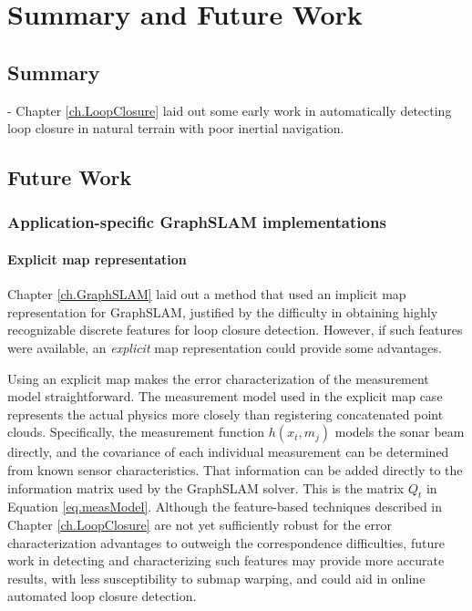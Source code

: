 
\chapter{Summary and Future Work}
\label{ch.FutureWork}

\section{Summary}
- Chapter \ref{ch.LoopClosure} laid out some early work in automatically detecting loop closure in natural terrain with poor inertial navigation. 

\section{Future Work}

\subsection{Application-specific GraphSLAM implementations}

\subsubsection{Explicit map representation}

Chapter \ref{ch.GraphSLAM} laid out a method that used an implicit map representation for GraphSLAM, justified by the difficulty in obtaining highly recognizable discrete features for loop closure detection. However, if such features were available, an \emph{explicit} map representation could provide some advantages. 

Using an explicit map makes the error characterization of the measurement model straightforward. The measurement model used in the explicit map case represents the actual physics more closely than registering concatenated point clouds. Specifically, the measurement function $h\left(x_t,m_j\right)$ models the sonar beam directly, and the covariance of each individual measurement can be determined from known sensor characteristics. That information can be added directly to the information matrix used by the GraphSLAM solver. This is the matrix $Q_t$ in Equation \ref{eq.measModel}. Although the feature-based techniques described in Chapter \ref{ch.LoopClosure} are not yet sufficiently robust for the error characterization advantages to outweigh the correspondence difficulties, future work in detecting and characterizing such features may provide more accurate results, with less susceptibility to submap warping, and could aid in online automated loop closure detection. 

